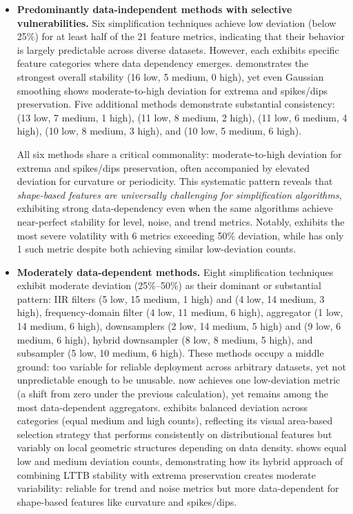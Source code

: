 \begin{itemize}
    \item \textbf{Predominantly data-independent methods with selective vulnerabilities.} Six simplification techniques achieve low deviation (below 25\%) for at least half of the 21 feature metrics, indicating that their behavior is largely predictable across diverse datasets. However, each exhibits specific feature categories where data dependency emerges. \methodGau{} demonstrates the strongest overall stability (16 low, 5 medium, 0 high), yet even Gaussian smoothing shows moderate-to-high deviation for extrema and spikes/dips preservation. Five additional methods demonstrate substantial consistency: \methodMean{} (13 low, 7 medium, 1 high), \methodSG{} (11 low, 8 medium, 2 high), \methodDP{} (11 low, 6 medium, 4 high), \methodButter{} (10 low, 8 medium, 3 high), and \methodMed{} (10 low, 5 medium, 6 high). 
    
    All six methods share a critical commonality: moderate-to-high deviation for extrema and spikes/dips preservation, often accompanied by elevated deviation for curvature or periodicity. This systematic pattern reveals that \emph{shape-based features are universally challenging for simplification algorithms}, exhibiting strong data-dependency even when the same algorithms achieve near-perfect stability for level, noise, and trend metrics. Notably, \methodMed{} exhibits the most severe volatility with 6 metrics exceeding 50\% deviation, while \methodMean{} has only 1 such metric despite both achieving similar low-deviation counts.
    
    \item \textbf{Moderately data-dependent methods.} Eight simplification techniques exhibit moderate deviation (25\%--50\%) as their dominant or substantial pattern: IIR filters \methodCheb{} (5 low, 15 medium, 1 high) and \methodEllip{} (4 low, 14 medium, 3 high), frequency-domain filter \methodFFT{} (4 low, 11 medium, 6 high), aggregator \methodPAA{} (1 low, 14 medium, 6 high), downsamplers  (2 low, 14 medium, 5 high) and \methodLTTB{} (9 low, 6 medium, 6 high), hybrid downsampler \methodMinMaxLTTB{} (8 low, 8 medium, 5 high), and subsampler \methodUniform{} (5 low, 10 medium, 6 high). These methods occupy a middle ground: too variable for reliable deployment across arbitrary datasets, yet not unpredictable enough to be unusable. \methodPAA{} now achieves one low-deviation metric (a shift from zero under the previous calculation), yet remains among the most data-dependent aggregators. \methodLTTB{} exhibits balanced deviation across categories (equal medium and high counts), reflecting its visual area-based selection strategy that performs consistently on distributional features but variably on local geometric structures depending on data density. \methodMinMaxLTTB{} shows equal low and medium deviation counts, demonstrating how its hybrid approach of combining LTTB stability with extrema preservation creates moderate variability: reliable for trend and noise metrics but more data-dependent for shape-based features like curvature and spikes/dips.
    

\end{itemize}
